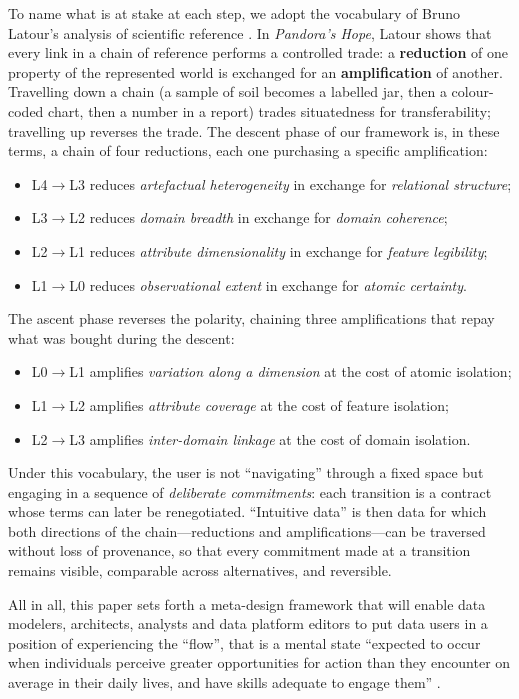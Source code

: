 \documentclass[]{hdsr}
\theoremstyle{plain}      %
\theoremstyle{definition} %
\theoremstyle{remark}     %
\begin{document}
To name what is at stake at each step, we adopt the vocabulary of Bruno Latour's analysis of scientific reference \citep{latour1999}. In \textit{Pandora's Hope}, Latour shows that every link in a chain of reference performs a controlled trade: a \textbf{reduction} of one property of the represented world is exchanged for an \textbf{amplification} of another. Travelling down a chain (a sample of soil becomes a labelled jar, then a colour-coded chart, then a number in a report) trades situatedness for transferability; travelling up reverses the trade. The descent phase of our framework is, in these terms, a chain of four reductions, each one purchasing a specific amplification:
\begin{itemize}[leftmargin=2em,itemsep=0.2em]
\item L4$\to$L3 reduces \textit{artefactual heterogeneity} in exchange for \textit{relational structure};
\item L3$\to$L2 reduces \textit{domain breadth} in exchange for \textit{domain coherence};
\item L2$\to$L1 reduces \textit{attribute dimensionality} in exchange for \textit{feature legibility};
\item L1$\to$L0 reduces \textit{observational extent} in exchange for \textit{atomic certainty}.
\end{itemize}
The ascent phase reverses the polarity, chaining three amplifications that repay what was bought during the descent:
\begin{itemize}[leftmargin=2em,itemsep=0.2em]
\item L0$\to$L1 amplifies \textit{variation along a dimension} at the cost of atomic isolation;
\item L1$\to$L2 amplifies \textit{attribute coverage} at the cost of feature isolation;
\item L2$\to$L3 amplifies \textit{inter-domain linkage} at the cost of domain isolation.
\end{itemize}
Under this vocabulary, the user is not ``navigating'' through a fixed space but engaging in a sequence of \emph{deliberate commitments}: each transition is a contract whose terms can later be renegotiated. ``Intuitive data'' is then data for which both directions of the chain---reductions and amplifications---can be traversed without loss of provenance, so that every commitment made at a transition remains visible, comparable across alternatives, and reversible.

All in all, this paper sets forth a meta-design framework that will enable data modelers, architects, analysts and data platform editors to put data users in a position of experiencing the ``flow'', that is a mental state ``expected to occur when individuals perceive greater opportunities for action than they encounter on average in their daily lives, and have skills adequate to engage them'' \citep{nakamura2014concept}.
\end{document}
